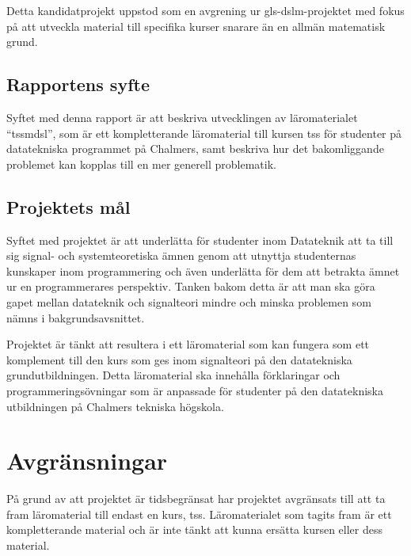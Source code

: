 \documentclass[12pt,a4paper,twoside,openright]{article}
\begin{document}
Detta kandidatprojekt uppstod som en avgrening ur
\gls{gls-dslm}-projektet med fokus på att utveckla material till
specifika kurser snarare än en allmän matematisk grund.

\subsection{Rapportens syfte}


Syftet med denna rapport är att beskriva utvecklingen av
läromaterialet ``\gls{tssmdsl}'', som är ett kompletterande
läromaterial till kursen \gls{tss} för studenter på datatekniska
programmet på Chalmers, samt beskriva hur det bakomliggande problemet
kan kopplas till en mer generell problematik.

\subsection{Projektets mål}
Syftet med projektet är att underlätta för studenter inom Datateknik
att ta till sig signal- och systemteoretiska ämnen genom att utnyttja
studenternas kunskaper inom programmering och även underlätta för dem
att betrakta ämnet ur en programmerares perspektiv. Tanken bakom detta
är att man ska göra gapet mellan datateknik och signalteori mindre och
minska problemen som nämns i bakgrundsavsnittet.

Projektet är tänkt att resultera i ett läromaterial som kan fungera
som ett komplement till den kurs som ges inom signalteori på den
datatekniska grund\-utbildningen. Detta läromaterial ska innehålla
förklaringar och programmeringsövningar som är anpassade för studenter
på den datatekniska utbildningen på Chalmers tekniska högskola.

\newpage

\section{Avgränsningar}
På grund av att projektet är tidsbegränsat har projektet avgränsats
till att ta fram läromaterial till endast en kurs,
\gls{tss}. Läromaterialet som tagits fram är ett kompletterande
material och är inte tänkt att kunna ersätta kursen eller dess
material.
\end{document}
